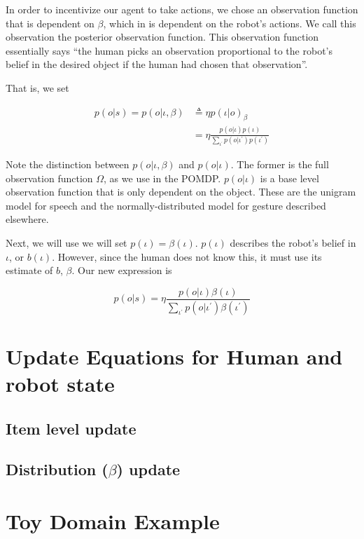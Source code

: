\documentclass{article}
\begin{document}
In order to incentivize our agent to take actions, we chose an observation function that is dependent on $\beta$, which in is dependent on the robot's actions. We call this observation the posterior observation function. This observation function essentially says ``the human picks an observation proportional to the robot's belief in the desired object if the human had chosen that observation''. 

That is, we set 

\begin{align}
p(o|s) = p(o|\iota, \beta) &\triangleq \eta p(\iota|o)_\beta \\
&= \eta \frac{p(o|\iota) p(\iota)}{\sum_{\iota^\prime} p(o|\iota^\prime)p(\iota^\prime)} 
\end{align}

Note the distinction between $p(o|\iota, \beta)$ and $p(o|\iota)$. The former is the full observation function $\Omega$, as we use in the POMDP. $p(o|\iota)$ is a base level observation function that is only dependent on the object. These are the unigram model for speech and the normally-distributed model for gesture described elsewhere. 

Next, we will use we will set $p(\iota) = \beta(\iota)$. $p(\iota)$ describes the robot's belief in $\iota$, or $b(\iota)$. However, since the human does not know this, it must use its estimate of $b$, $\beta$. Our new expression is 


$$p(o|s) = \eta \frac{p(o|\iota) \beta(\iota)}{\sum_{\iota^\prime} p(o|\iota^\prime)\beta(\iota^\prime)} $$


\section{Update Equations for Human and robot state}
\subsection{Item level update}

\subsection{Distribution ($\beta$) update}

\section{Toy Domain Example} 
\end{document}

